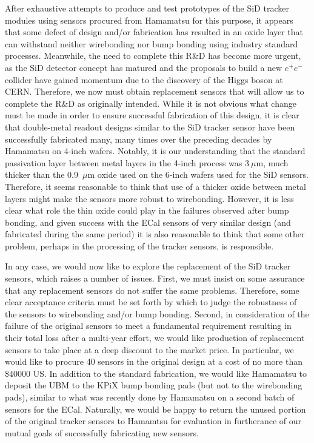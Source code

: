 \documentclass[prc,12pt,nofootinbib,letterpaper]{revtex4}
\begin{document}
After exhaustive attempts to produce and test prototypes of the SiD tracker modules using  sensors procured from Hamamatsu for this purpose, it appears that some defect of design and/or fabrication has resulted in an oxide layer that can withstand neither wirebonding nor bump bonding using industry standard processes.  Meanwhile, the need to complete this R\&D has become more urgent, as the SiD detector concept has matured and the proposals to build a new $e^+e^-$ collider have gained momentum due to the discovery of the Higgs boson at CERN.  Therefore, we now must obtain replacement sensors that will allow us to complete the R\&D as originally intended.  While it is not obvious what change must be made in order to ensure successful fabrication of this design, it is clear that double-metal readout designs similar to the SiD tracker sensor have been successfully fabricated many, many times over the preceding decades by Hamamatsu on 4-inch wafers. Notably, it is our understanding that the standard passivation layer between metal layers in the 4-inch process was 3$~\mu$m, much thicker than the 0.9~$\mu$m oxide used on the 6-inch wafers used for the SiD sensors.    Therefore, it seems reasonable to think that use of a thicker oxide between metal layers might make the sensors more robust to wirebonding.  However, it is less clear what role the thin oxide could play in the failures observed after bump bonding, and given success with the ECal sensors of very similar design (and fabricated during the same period) it is also reasonable to think that some other problem, perhaps in the processing of the tracker sensors, is responsible.

In any case, we would now like to explore the replacement of the SiD tracker sensors, which raises a number of issues.  First, we must insist on some assurance that any replacement sensors do not suffer the same problems. Therefore, some clear acceptance criteria must be set forth by which to judge the robustness of the sensors to wirebonding and/or bump bonding.  Second, in consideration of the failure of the original sensors to meet a fundamental requirement resulting in their total loss after a multi-year effort, we would like production of replacement sensors to take place at a deep discount to the market price.  In particular, we would like to procure 40 sensors in the original design at a cost of no more than \$40000 US. In addition to the standard fabrication, we would like Hamamatsu to deposit the UBM to the KPiX bump bonding pads (but not to the wirebonding pads), similar to what was recently done by Hamamatsu on a second batch of sensors for the ECal. Naturally, we would be happy to return the unused portion of the original tracker sensors to Hamamtsu for evaluation in furtherance of our mutual goals of successfully fabricating new sensors.
\end{document}
